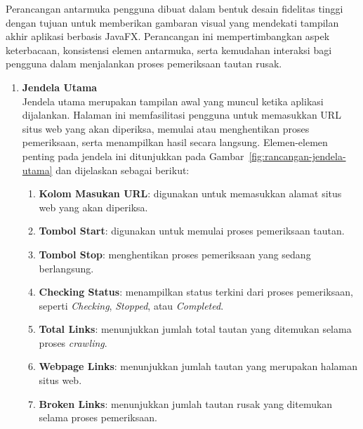 Perancangan antarmuka pengguna dibuat dalam bentuk desain fidelitas tinggi dengan tujuan untuk memberikan gambaran visual yang mendekati tampilan akhir aplikasi berbasis JavaFX. Perancangan ini mempertimbangkan aspek keterbacaan, konsistensi elemen antarmuka, serta kemudahan interaksi bagi pengguna dalam menjalankan proses pemeriksaan tautan rusak.

\begin{enumerate}
    \item \textbf{Jendela Utama} \\
    Jendela utama merupakan tampilan awal yang muncul ketika aplikasi dijalankan. Halaman ini memfasilitasi pengguna untuk memasukkan URL situs web yang akan diperiksa, memulai atau menghentikan proses pemeriksaan, serta menampilkan hasil secara langsung. Elemen-elemen penting pada jendela ini ditunjukkan pada Gambar~\ref{fig:rancangan-jendela-utama} dan dijelaskan sebagai berikut:
    
    \begin{enumerate}
        
        \item \textbf{Kolom Masukan URL}: digunakan untuk memasukkan alamat situs web yang akan diperiksa.
        
        \item \textbf{Tombol Start}: digunakan untuk memulai proses pemeriksaan tautan.
        
        \item \textbf{Tombol Stop}: menghentikan proses pemeriksaan yang sedang berlangsung.
        
        \item \textbf{Checking Status}: menampilkan status terkini dari proses pemeriksaan, seperti \textit{Checking}, \textit{Stopped}, atau \textit{Completed}.
        
        \item \textbf{Total Links}: menunjukkan jumlah total tautan yang ditemukan selama proses \textit{crawling}.
        
        \item \textbf{Webpage Links}: menunjukkan jumlah tautan yang merupakan halaman situs web.
        
        \item \textbf{Broken Links}: menunjukkan jumlah tautan rusak yang ditemukan selama proses pemeriksaan.
        

\end{enumerate}
\end{enumerate}
